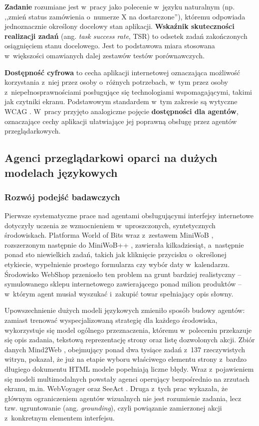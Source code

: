 \textbf{Zadanie} rozumiane jest w~pracy jako polecenie w~języku naturalnym (np. ,,zmień status zamówienia o~numerze X na dostarczone''), któremu odpowiada jednoznacznie określony docelowy stan aplikacji. \textbf{Wskaźnik skuteczności realizacji zadań} (ang. \textit{task success rate}, TSR) to odsetek zadań zakończonych osiągnięciem stanu docelowego. Jest to podstawowa miara stosowana w~większości omawianych dalej zestawów testów porównawczych.

\textbf{Dostępność cyfrowa} to cecha aplikacji internetowej oznaczająca możliwość korzystania z~niej przez osoby o~różnych potrzebach, w~tym przez osoby z~niepełnosprawnościami posługujące się technologiami wspomagającymi, takimi jak czytniki ekranu. Podstawowym standardem w~tym zakresie są wytyczne WCAG \citep{w3c2023wcag22}. W~pracy przyjęto analogiczne pojęcie \textbf{dostępności dla agentów}, oznaczające cechy aplikacji ułatwiające jej poprawną obsługę przez agentów przeglądarkowych.

\subsection{Agenci przeglądarkowi oparci na dużych modelach językowych}
\label{sec:agenci}

\subsubsection{Rozwój podejść badawczych}
Pierwsze systematyczne prace nad agentami obsługującymi interfejsy internetowe dotyczyły uczenia ze wzmocnieniem w~uproszczonych, syntetycznych środowiskach. Platforma World of Bits wraz z~zestawem MiniWoB \citep{shi2017wob}, rozszerzonym następnie do MiniWoB++ \citep{liu2018miniwob}, zawierała kilkadziesiąt, a~następnie ponad sto niewielkich zadań, takich jak kliknięcie przycisku o~określonej etykiecie, wypełnienie prostego formularza czy wybór daty w~kalendarzu. Środowisko WebShop \citep{yao2022webshop} przeniosło ten problem na grunt bardziej realistyczny -- symulowanego sklepu internetowego zawierającego ponad milion produktów -- w~którym agent musiał wyszukać i~zakupić towar spełniający opis słowny.

Upowszechnienie dużych modeli językowych zmieniło sposób budowy agentów: zamiast trenować wyspecjalizowaną strategię dla każdego środowiska, wykorzystuje się model ogólnego przeznaczenia, któremu w~poleceniu przekazuje się opis zadania, tekstową reprezentację strony oraz listę dozwolonych akcji. Zbiór danych Mind2Web \citep{deng2023mind2web}, obejmujący ponad dwa tysiące zadań z~137 rzeczywistych witryn, pokazał, że już na etapie wyboru właściwego elementu strony z~bardzo długiego dokumentu HTML modele popełniają liczne błędy. Wraz z~pojawieniem się modeli multimodalnych powstały agenci operujący bezpośrednio na zrzutach ekranu, m.in. WebVoyager \citep{he2024webvoyager} oraz SeeAct \citep{zheng2024seeact}. Druga z~tych prac wykazała, że głównym ograniczeniem agentów wizualnych nie jest rozumienie zadania, lecz tzw. ugruntowanie (ang. \textit{grounding}), czyli powiązanie zamierzonej akcji z~konkretnym elementem interfejsu.

